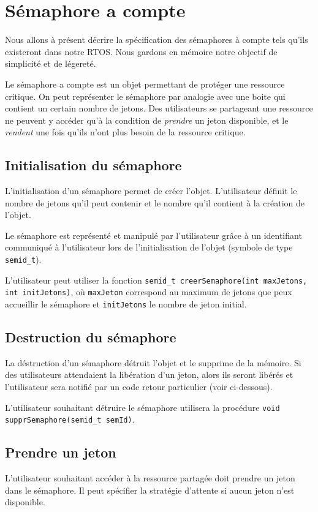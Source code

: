 \section{Sémaphore a compte}

Nous allons à présent décrire la spécification des sémaphores à compte tels
qu'ils existeront dans notre RTOS. Nous gardons en mémoire notre objectif de
simplicité et de légereté.

Le sémaphore a compte est un objet permettant de protéger une ressource
critique. On peut représenter le sémaphore par analogie avec une boite qui
contient un certain nombre de jetons. Des utilisateurs se partageant une
ressource ne peuvent y accéder qu'à la condition de \emph{prendre} un jeton
disponible, et le \emph{rendent} une fois qu'ils n'ont plus besoin de la
ressource critique.

\subsection{Initialisation du sémaphore}

L'initialisation d'un sémaphore permet de créer l'objet. L'utilisateur définit le nombre de jetons qu'il peut contenir et le nombre qu'il contient à la création de l'objet.

Le sémaphore est représenté et manipulé par l'utilisateur grâce à un identifiant communiqué à l'utilisateur lors de l'initialisation de l'objet (symbole de type \texttt{semid\_t}).

L'utilisateur peut utiliser la fonction \texttt{semid\_t creerSemaphore(int maxJetons, int initJetons)}, où \texttt{maxJeton} correspond au maximum de jetons que peux accueillir le sémaphore et \texttt{initJetons} le nombre de jeton initial.


\subsection{Destruction du sémaphore}
La déstruction d'un sémaphore détruit l'objet et le supprime de la mémoire. Si des utilisateurs attendaient la libération d'un jeton, alors ils seront libérés et l'utilisateur sera notifié par un code retour particulier (voir ci-dessous).

L'utilisateur souhaitant détruire le sémaphore utilisera la procédure \texttt{void supprSemaphore(semid\_t semId)}.

\subsection{Prendre un jeton}
L'utilisateur souhaitant accéder à la ressource partagée doit prendre un jeton
dans le sémaphore. Il peut spécifier la stratégie d'attente si aucun jeton
n'est disponible.

